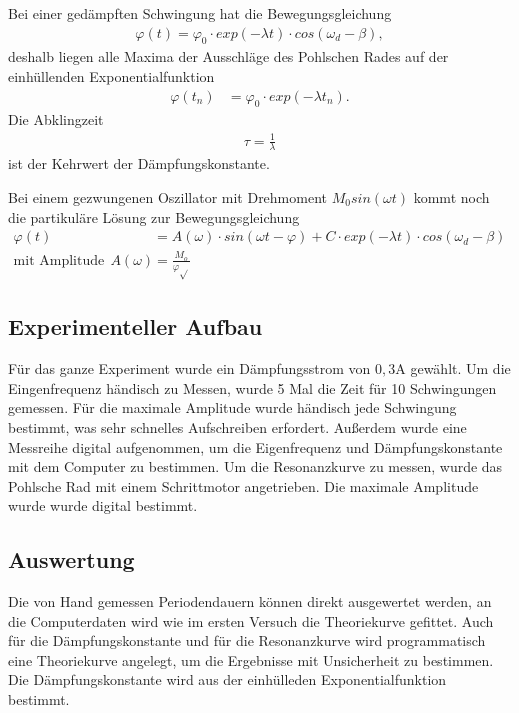 \documentclass[11pt, a4paper]{article}
\begin{document}
    Bei einer gedämpften Schwingung hat die Bewegungsgleichung
    \begin{align}
        \varphi(t) = \varphi_0 \cdot exp(-\lambda t) \cdot cos(\omega_d - \beta), \label{theo5}
    \end{align}
    deshalb liegen alle Maxima der Ausschläge des Pohlschen Rades auf der einhüllenden Exponentialfunktion
    \begin{align}
        \varphi(t_n) &= \varphi_0 \cdot exp(-\lambda t_n).
    \end{align}
    Die Abklingzeit
    \begin{align}
        \tau = \frac{1}{\lambda}
    \end{align}
    ist der Kehrwert der Dämpfungskonstante.

    Bei einem gezwungenen Oszillator mit Drehmoment $M_0 sin(\omega t)$ kommt noch die partikuläre Lösung zur Bewegungsgleichung
    \begin{align}
        \varphi(t) &= A(\omega) \cdot sin(\omega t - \varphi) + C \cdot exp(-\lambda t) \cdot cos(\omega_d - \beta) \\
        \text{mit Amplitude}  \ \ A(\omega) &= \frac{M_o}{\varphi \sqrt{}}
    \end{align}

    \subsection{Experimenteller Aufbau}
    Für das ganze Experiment wurde ein Dämpfungsstrom von $0,3 \si{\ampere}$ gewählt.
    Um die Eingenfrequenz händisch zu Messen, wurde 5 Mal die Zeit für 10 Schwingungen gemessen.
    Für die maximale Amplitude wurde händisch jede Schwingung bestimmt, was sehr schnelles Aufschreiben erfordert.
    Außerdem wurde eine Messreihe digital aufgenommen, um die Eigenfrequenz und Dämpfungskonstante mit dem Computer zu bestimmen.
    Um die Resonanzkurve zu  messen, wurde das Pohlsche Rad mit einem Schrittmotor angetrieben. Die maximale Amplitude wurde
    wurde digital bestimmt.

    \subsection{Auswertung}
    Die von Hand gemessen Periodendauern können direkt ausgewertet werden, an die Computerdaten
    wird wie im ersten Versuch die Theoriekurve gefittet. Auch für die Dämpfungskonstante und für die
    Resonanzkurve wird programmatisch eine Theoriekurve angelegt, um die Ergebnisse mit Unsicherheit
    zu bestimmen. Die Dämpfungskonstante wird aus der einhülleden Exponentialfunktion bestimmt.
\end{document}
